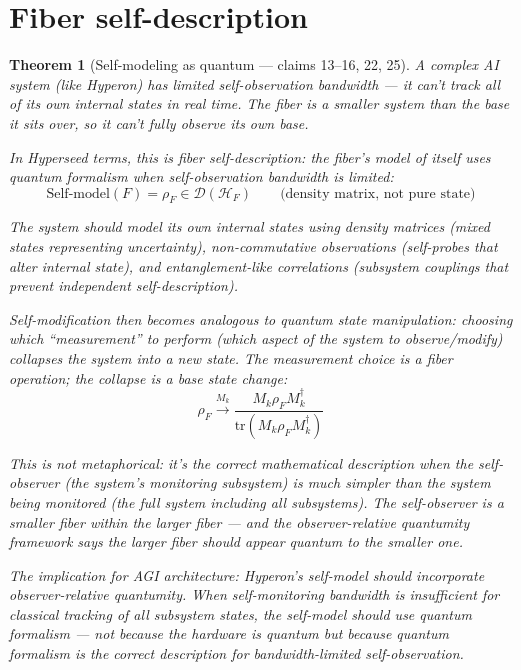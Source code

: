\documentclass[11pt,a4paper]{article}
\newtheorem{theorem}[definition]{Theorem}
\begin{document}
\section{Fiber self-description}
\label{sec:self}

\begin{theorem}[Self-modeling as quantum --- claims 13--16, 22, 25]
\label{thm:self}
A complex AI system (like Hyperon) has limited self-observation bandwidth
--- it can't track all of its own internal states in real time. The fiber
is a smaller system than the base it sits over, so it can't fully observe
its own base.

In Hyperseed terms, this is \emph{fiber self-description}: the fiber's
model of itself uses quantum formalism when self-observation bandwidth
is limited:
\[
  \text{Self-model}(F) = \rho_F \in \mathcal{D}(\mathcal{H}_F)
  \qquad \text{(density matrix, not pure state)}
\]

The system should model its own internal states using density matrices
(mixed states representing uncertainty), non-commutative observations
(self-probes that alter internal state), and entanglement-like correlations
(subsystem couplings that prevent independent self-description).

Self-modification then becomes analogous to quantum state manipulation:
choosing which ``measurement'' to perform (which aspect of the system to
observe/modify) collapses the system into a new state. The measurement
choice is a fiber operation; the collapse is a base state change:
\[
  \rho_F \xrightarrow{M_k} \frac{M_k \rho_F M_k^\dagger}
  {\text{tr}(M_k \rho_F M_k^\dagger)}
\]

This is not metaphorical: it's the correct mathematical description when
the self-observer (the system's monitoring subsystem) is much simpler
than the system being monitored (the full system including all subsystems).
The self-observer is a smaller fiber within the larger fiber --- and the
observer-relative quantumity framework says the larger fiber should appear
quantum to the smaller one.

The implication for AGI architecture: Hyperon's self-model should
incorporate observer-relative quantumity. When self-monitoring bandwidth
is insufficient for classical tracking of all subsystem states, the
self-model should use quantum formalism --- not because the hardware
is quantum but because quantum formalism is the correct description
for bandwidth-limited self-observation.
\end{theorem}
\end{document}

